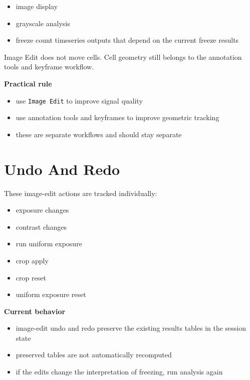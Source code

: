 \documentclass[
  9pt,
  letterpaper,
  oneside,
  open=any,
  DIV=15,
  parskip=half-,
  headings=big,
  numbers=noenddot
]{scrbook}
\newcommand{\manuallead}[1]{%
  \vspace{0.15em}%
  {\sffamily\bfseries\color{ManualBlue}#1}\par\nobreak\vspace{0.05em}%
}
\begin{document}
\begin{itemize}[leftmargin=*,itemsep=0.35em,topsep=0.4em]
\item image display
\item grayscale analysis
\item freeze count timeseries outputs that depend on the current freeze results
\end{itemize}

Image Edit does not move cells. Cell geometry still belongs to the annotation tools and keyframe workflow.


\manuallead{Practical rule}

\begin{itemize}[leftmargin=*,itemsep=0.35em,topsep=0.4em]
\item use \texttt{Image Edit} to improve signal quality
\item use annotation tools and keyframes to improve geometric tracking
\item these are separate workflows and should stay separate
\end{itemize}

\section{Undo And Redo}

These image-edit actions are tracked individually:


\begin{itemize}[leftmargin=*,itemsep=0.35em,topsep=0.4em]
\item exposure changes
\item contrast changes
\item run uniform exposure
\item crop apply
\item crop reset
\item uniform exposure reset
\end{itemize}

\manuallead{Current behavior}

\begin{itemize}[leftmargin=*,itemsep=0.35em,topsep=0.4em]
\item image-edit undo and redo preserve the existing results tables in the session state
\item preserved tables are not automatically recomputed
\item if the edits change the interpretation of freezing, run analysis again
\end{itemize}
\end{document}
